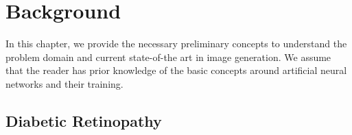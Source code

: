 \chapter{Background} \label{cha:background}



In this chapter, we provide the necessary preliminary concepts to understand the problem domain and current state-of-the art in image generation.
We assume that the reader has prior knowledge of the basic concepts around artificial neural networks and their training.

\section{Diabetic Retinopathy} \label{background:classifyingdr}

